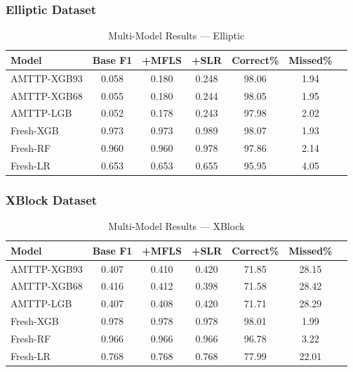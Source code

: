 \documentclass[journal]{IEEEtran}
\begin{document}
\subsubsection{Elliptic Dataset}

\begin{table}[!t]
\centering
\caption{Multi-Model Results --- Elliptic}
\label{tab:multi_elliptic}
\setlength{\tabcolsep}{3pt}
\begin{tabular}{@{}lcccccc@{}}
\toprule
\textbf{Model} & \textbf{Base F1} & \textbf{+MFLS} & \textbf{+SLR} & \textbf{Correct\%} & \textbf{Missed\%} \\
\midrule
AMTTP-XGB93  & 0.058 & 0.180 & 0.248 & 98.06 & 1.94 \\
AMTTP-XGB68  & 0.055 & 0.180 & 0.244 & 98.05 & 1.95 \\
AMTTP-LGB    & 0.052 & 0.178 & 0.243 & 97.98 & 2.02 \\
Fresh-XGB    & 0.973 & 0.973 & 0.989 & 98.07 & 1.93 \\
Fresh-RF     & 0.960 & 0.960 & 0.978 & 97.86 & 2.14 \\
Fresh-LR     & 0.653 & 0.653 & 0.655 & 95.95 & 4.05 \\
\bottomrule
\end{tabular}
\end{table}

\subsubsection{XBlock Dataset}

\begin{table}[!t]
\centering
\caption{Multi-Model Results --- XBlock}
\label{tab:multi_xblock}
\setlength{\tabcolsep}{3pt}
\begin{tabular}{@{}lcccccc@{}}
\toprule
\textbf{Model} & \textbf{Base F1} & \textbf{+MFLS} & \textbf{+SLR} & \textbf{Correct\%} & \textbf{Missed\%} \\
\midrule
AMTTP-XGB93  & 0.407 & 0.410 & 0.420 & 71.85 & 28.15 \\
AMTTP-XGB68  & 0.416 & 0.412 & 0.398 & 71.58 & 28.42 \\
AMTTP-LGB    & 0.407 & 0.408 & 0.420 & 71.71 & 28.29 \\
Fresh-XGB    & 0.978 & 0.978 & 0.978 & 98.01 & 1.99 \\
Fresh-RF     & 0.966 & 0.966 & 0.966 & 96.78 & 3.22 \\
Fresh-LR     & 0.768 & 0.768 & 0.768 & 77.99 & 22.01 \\
\bottomrule
\end{tabular}
\end{table}
\end{document}

